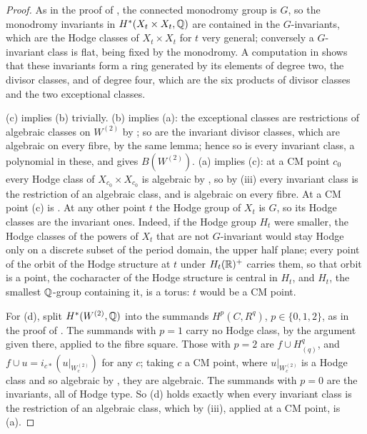 \begin{proof}
As in the proof of , the connected monodromy group
is $G$, so the monodromy invariants in $H^{*}(X_{t}\times X_{t},\mathbb{Q})$ are
contained in the $G$-invariants, which are the Hodge classes of
$X_{t}\times X_{t}$ for $t$ very general; conversely a $G$-invariant class is
flat, being fixed by the monodromy. A computation in \cite{BMB26} shows that these invariants
form a ring generated by its elements of degree two, the divisor classes, and
of degree four, which are the six products of divisor classes and the two
exceptional classes.

(c) implies (b) trivially. (b) implies (a): the exceptional classes are
restrictions of algebraic classes on $W^{(2)}$ by ; so are
the invariant divisor classes, which are algebraic on every fibre, by the
same lemma; hence so is every invariant class, a polynomial in these, and
 gives $B(W^{(2)})$. (a) implies (c): at a CM point
$c_{0}$ every Hodge class of $X_{c_{0}}\times X_{c_{0}}$ is algebraic by
, so by (iii) every
invariant class is the restriction of an algebraic class, and is algebraic on
every fibre. At a CM point (c) is . At any other point
$t$ the Hodge group of $X_{t}$ is $G$, so its Hodge classes are the
invariant ones. Indeed, if the Hodge group $H_{t}$ were smaller, the Hodge
classes of the powers of $X_{t}$ that are not $G$-invariant would stay Hodge
only on a discrete subset of the period domain, the upper half plane; every
point of the orbit of the Hodge structure at $t$ under $H_{t}(\mathbb{R})^{+}$
carries them, so that orbit is a point, the cocharacter of
the Hodge structure is central in $H_{t}$, and $H_{t}$, the smallest
$\mathbb{Q}$-group containing it, is a torus: $t$ would be a CM point.

For (d), split $H^{*}(W^{(2)},\mathbb{Q})$ into the summands $H^{p}(C,R^{q})$,
$p\in\{0,1,2\}$, as in the proof of . The summands
with $p=1$ carry no Hodge class, by the argument given there, applied to the
fibre square. Those with $p=2$ are $f\cup H^{q}_{(q)}$, and
$f\cup u=i_{c*}(u|_{W^{(2)}_{c}})$ for any $c$; taking $c$ a CM point, where
$u|_{W^{(2)}_{c}}$ is a Hodge class and so algebraic by ,
they are algebraic. The summands with $p=0$ are the invariants, all of Hodge
type. So (d) holds exactly when every invariant class is the restriction of an
algebraic class, which by (iii), applied at a
CM point, is (a).
\end{proof}

